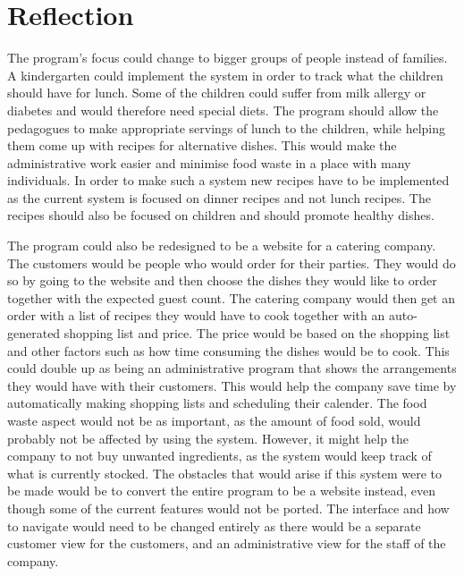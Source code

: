 \section{Reflection}
The program's focus could change to bigger groups of people instead of families. A kindergarten could implement the system in order to track what the children should have for lunch. Some of the children could suffer from milk allergy or diabetes and would therefore need special diets. The program should allow the pedagogues to make appropriate servings of lunch to the children, while helping them come up with recipes for alternative dishes. This would make the administrative work easier and minimise food waste in a place with many individuals. In order to make such a system new recipes have to be implemented as the current system is focused on dinner recipes and not lunch recipes. The recipes should also be focused on children and should promote healthy dishes.

The program could also be redesigned to be a website for a catering company. The customers would be people who would order for their parties. They would do so by going to the website and then choose the dishes they would like to order together with the expected guest count. The catering company would then get an order with a list of recipes they would have to cook together with an auto-generated shopping list and price. The price would be based on the shopping list and other factors such as how time consuming the dishes would be to cook. This could double up as being an administrative program that shows the arrangements they would have with their customers. This would help the company save time by automatically making shopping lists and scheduling their calender. The food waste aspect would not be as important, as the amount of food sold, would probably not be affected by using the system. However, it might help the company to not buy unwanted ingredients, as the system would keep track of what is currently stocked. The obstacles that would arise if this system were to be made would be to convert the entire program to be a website instead, even though some of the current features would not be ported. The interface and how to navigate would need to be changed entirely as there would be a separate customer view for the customers, and an administrative view for the staff of the company.